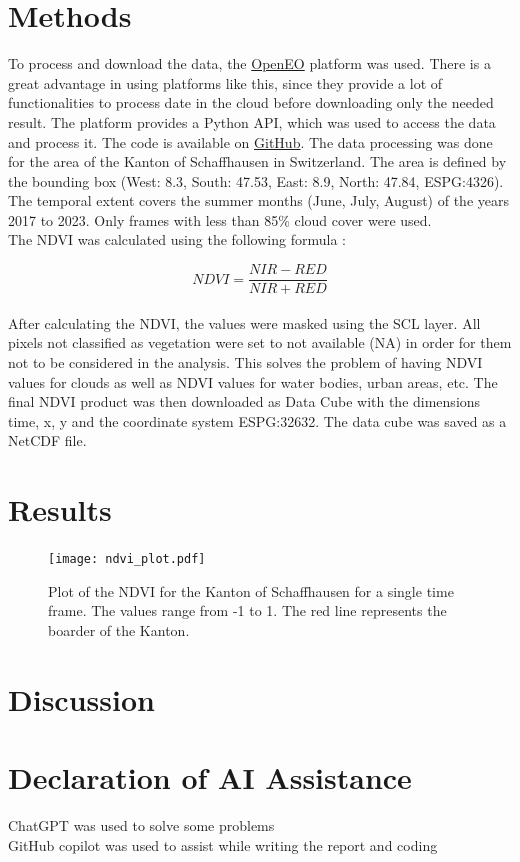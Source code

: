 \documentclass{article}
\begin{document}
\section*{Methods}

To process and download the data, the \href{https://openeo.dataspace.copernicus.eu/}{OpenEO} platform was used. There is a
great advantage in using platforms like this, since they provide a lot of functionalities to process date in the cloud
before downloading only the needed result. The platform provides a Python API, which was used to access the data and process it.
The code is available on \href{https://github.com/juliankraft/RemoteSensing_Task01}{GitHub}. 
The data processing was done for the area of the Kanton of Schaffhausen in Switzerland. The area is defined by the bounding box
(West: 8.3, South: 47.53, East: 8.9, North: 47.84, ESPG:4326). 
The temporal extent covers the summer months (June, July, August) of the years 2017 to 2023. Only frames with less than 85\% 
cloud cover were used.\\

The NDVI was calculated using the following formula \autocite{ndvi_sentinelhub}:

\begin{equation}
    NDVI = \frac{NIR - RED}{NIR + RED}
\end{equation}\\

After calculating the NDVI, the values were masked using the SCL layer. All pixels not classified as vegetation were set to not 
available (NA) in order for them not to be considered in the analysis. This solves the problem of having NDVI values for clouds as well
as NDVI values for water bodies, urban areas, etc. The final NDVI product was then downloaded as Data Cube with the dimensions
time, x, y and the coordinate system ESPG:32632. The data cube was saved as a NetCDF file.\\

\section*{Results}

\begin{figure}[ht]
  \centering
  \texttt{[image: ndvi\_plot.pdf]}
  \caption{Plot of the NDVI for the Kanton of Schaffhausen for a single time frame. The values range from -1 to 1. The red line represents the boarder of the Kanton.}
  \label{fig:ndvi_plot}
\end{figure}


\section*{Discussion}


\vfill
\section*{Declaration of AI Assistance}
ChatGPT was used to solve some problems\\
GitHub copilot was used to assist while writing the report and coding


\printbibliography
\end{document}
